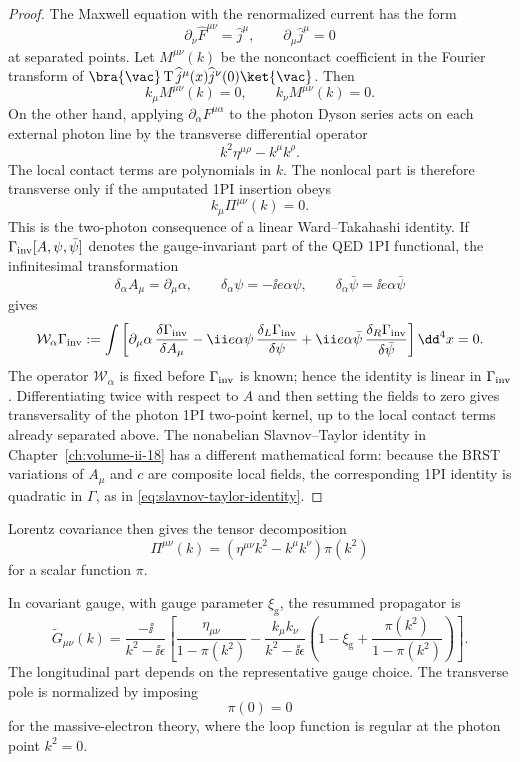 \begin{proof}
The Maxwell equation with the renormalized current has the form
\[
  \partial_\nu \widehat F^{\mu\nu}=\widehat j^\mu,
  \qquad
  \partial_\mu\widehat j^\mu=0
\]
at separated points.  Let \(M^{\mu\nu}(k)\) be the noncontact coefficient in
the Fourier transform of
\(\bra{\vac}\operatorname T\widehat j^\mu(x)\widehat j^\nu(0)\ket{\vac}\).
Then
\[
  k_\mu M^{\mu\nu}(k)=0,\qquad k_\nu M^{\mu\nu}(k)=0 .
\]
On the other hand, applying
\(\partial_\alpha F^{\mu\alpha}\) to the photon Dyson series acts on each
external photon line by the transverse differential operator
\[
  k^2\eta^{\mu\rho}-k^\mu k^\rho .
\]
The local contact terms are polynomials in \(k\).  The nonlocal part is
therefore transverse only if the amputated 1PI insertion obeys
\[
  k_\mu\Pi^{\mu\nu}(k)=0 .
\]
This is the two-photon consequence of a linear Ward--Takahashi identity.  If
\(\Gamma_{\rm inv}[A,\psi,\bar\psi]\) denotes the gauge-invariant part of the
QED 1PI functional, the infinitesimal transformation
\[
  \delta_\alpha A_\mu=\partial_\mu\alpha,\qquad
  \delta_\alpha\psi=-\ii e\alpha\psi,\qquad
  \delta_\alpha\bar\psi=\ii e\alpha\bar\psi
\]
gives
\[
  \mathcal W_\alpha\Gamma_{\rm inv}
  :=
  \int
  \left[
    \partial_\mu\alpha\,\frac{\delta\Gamma_{\rm inv}}{\delta A_\mu}
    -
    \ii e\alpha\psi\,\frac{\delta_L\Gamma_{\rm inv}}{\delta\psi}
    +
    \ii e\alpha\bar\psi\,
      \frac{\delta_R\Gamma_{\rm inv}}{\delta\bar\psi}
  \right]\dd^4x
  =
  0 .
\]
The operator \(\mathcal W_\alpha\) is fixed before \(\Gamma_{\rm inv}\) is
known; hence the identity is linear in \(\Gamma_{\rm inv}\).  Differentiating
twice with respect to \(A\) and then setting the fields to zero gives
transversality of the photon 1PI two-point kernel, up to the local contact
terms already separated above.  The nonabelian Slavnov--Taylor identity in
Chapter~\ref{ch:volume-ii-18} has a different mathematical
form: because the BRST variations of \(A_\mu\) and \(c\) are composite local
fields, the corresponding 1PI identity is quadratic in \(\Gamma\), as in
\eqref{eq:slavnov-taylor-identity}.
\end{proof}

Lorentz covariance then gives the tensor decomposition
\[
  \Pi^{\mu\nu}(k)
  =
  (\eta^{\mu\nu}k^2-k^\mu k^\nu)\pi(k^2)
\]
for a scalar function \(\pi\).

In covariant gauge, with gauge parameter \(\xi_{\mathrm g}\), the resummed
propagator is
\[
  \widetilde G_{\mu\nu}(k)
  =
  \frac{-\ii}{k^2-\ii\epsilon}
  \left[
    \frac{\eta_{\mu\nu}}{1-\pi(k^2)}
    -
    \frac{k_\mu k_\nu}{k^2-\ii\epsilon}
    \left(
      1-\xi_{\mathrm g}
      +\frac{\pi(k^2)}{1-\pi(k^2)}
    \right)
  \right].
\]
The longitudinal part depends on the representative gauge choice. The
transverse pole is normalized by imposing
\[
  \pi(0)=0
\]
for the massive-electron theory, where the loop function is regular at the
photon point \(k^2=0\).

